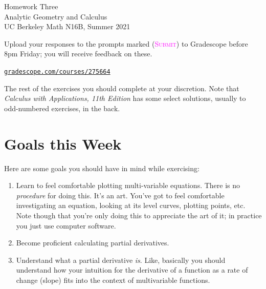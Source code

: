

\usepackage{fourier}



\pagestyle{empty}




\begin{center}
    {\Huge{Homework Three}}
    \\ \footnotesize{Analytic Geometry and Calculus}
    \\ \footnotesize{UC Berkeley Math N16B, Summer 2021}
\end{center}
\vspace{2em}

Upload your responses to the prompts marked
(\textsc{\textcolor{magenta}{Submit}})
to Gradescope before 8pm Friday; 
you will receive feedback on these.
\begin{center}
    \href{https://www.gradescope.com/courses/275664}%
    {\texttt{gradescope.com/courses/275664}}
\end{center}
The rest of the exercises you should complete at your discretion.
Note that \emph{Calculus with Applications, 11th Edition} 
has some select solutions, usually to odd-numbered exercises, in the back.


\section*{Goals this Week}

Here are some goals you should have in mind while exercising:
\begin{enumerate}
    \item 
        Learn to feel comfortable plotting multi-variable equations. 
        There is no \emph{procedure} for doing this.
        It's an art. You've got to feel comfortable investigating an equation,
        looking at its level curves, plotting points, etc. 
        Note though that you're only doing this to appreciate the art of it;
        in practice you just use computer software.
    \item 
        Become proficient calculating partial derivatives.
    \item
        Understand what a partial derivative \emph{is}.
        Like, basically you should understand how your intuition 
        for the derivative of a function as a rate of change (slope)
        fits into the context of multivariable functions.
\end{enumerate}

